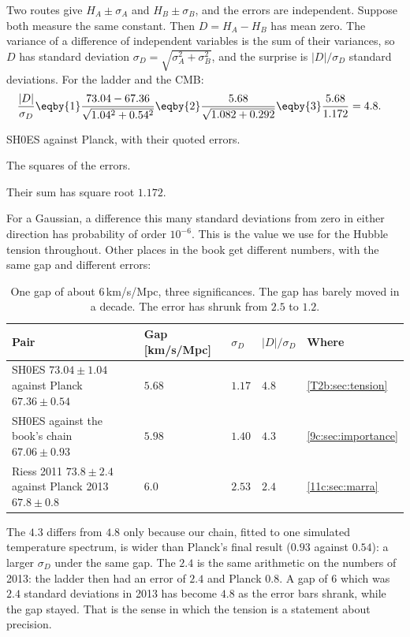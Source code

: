 Two routes give $H_A\pm\sigma_A$ and $H_B\pm\sigma_B$, and the errors are independent. Suppose both measure
the same constant. Then $D=H_A-H_B$ has mean zero. The variance of a difference of
independent variables is the sum of their variances, so $D$ has standard deviation
$\sigma_D=\sqrt{\sigma_A^2+\sigma_B^2}$, and the surprise is $|D|/\sigma_D$ standard deviations.
For the ladder and the CMB:
\begin{align}
  \frac{|D|}{\sigma_D}
  &\eqby{1}\frac{73.04-67.36}{\sqrt{1.04^2+0.54^2}}
   \eqby{2}\frac{5.68}{\sqrt{1.082+0.292}}
   \eqby{3}\frac{5.68}{1.172}
   =4.8 .
  \label{11c:eq:h0-sigma}
\end{align}
\begin{explain}
  \item SH0ES against Planck, with their quoted errors.
  \item The squares of the errors.
  \item Their sum has square root $1.172$.
\end{explain}
For a Gaussian, a difference this many standard deviations from zero in either direction has
probability of order $10^{-6}$. This is the value we use for the Hubble tension throughout.
Other places in the book get different numbers, with the same gap and different errors:

\begin{table}[htbp]
\centering
\small
\renewcommand{\arraystretch}{1.25}
\begin{tabular}{@{}p{3.4cm}p{3.0cm}p{1.8cm}p{1.7cm}p{3.0cm}@{}}
\toprule
Pair & Gap [km/s/Mpc] & $\sigma_D$ & $|D|/\sigma_D$ & Where\\
\midrule
SH0ES $73.04\pm1.04$ against Planck $67.36\pm0.54$ & $5.68$ & $1.17$ & $4.8$ & \cref{T2b:sec:tension}\\
SH0ES against the book's chain $67.06\pm0.93$ & $5.98$ & $1.40$ & $4.3$ & \cref{9c:sec:importance}\\
Riess 2011 $73.8\pm2.4$ against Planck 2013 $67.8\pm0.8$ & $6.0$ & $2.53$ & $2.4$ & \cref{11c:sec:marra}\\
\bottomrule
\end{tabular}
\caption{One gap of about $6$\,km/s/Mpc, three significances. The gap has barely moved in
a decade. The error has shrunk from $2.5$ to $1.2$.}
\label{11c:tab:h0-gap}
\end{table}

The $4.3$ differs from $4.8$ only because our chain, fitted to one simulated temperature
spectrum, is wider than Planck's final result ($0.93$ against $0.54$): a larger $\sigma_D$
under the same gap. The $2.4$ is the same arithmetic on the numbers of 2013: the ladder
then had an error of $2.4$ and Planck $0.8$. A gap of $6$ which was
$2.4$ standard deviations in 2013 has become $4.8$ as the error bars shrank, while the gap
stayed. That is the sense in which the tension is a statement about precision.

